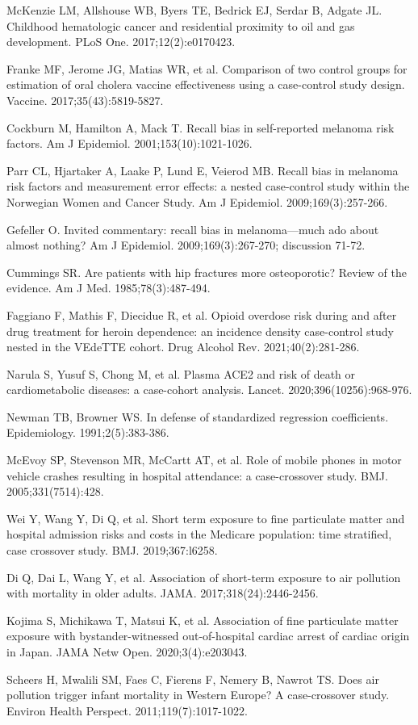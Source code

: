 \begin{references}
\item McKenzie LM, Allshouse WB, Byers TE, Bedrick EJ, Serdar B, Adgate JL. Childhood hematologic cancer and residential proximity to oil and gas development. PLoS One. 2017;12(2):e0170423.
\item Franke MF, Jerome JG, Matias WR, et al. Comparison of two control groups for estimation of oral cholera vaccine effectiveness using a case-control study design. Vaccine. 2017;35(43):5819-5827.
\item Cockburn M, Hamilton A, Mack T. Recall bias in self-reported melanoma risk factors. Am J Epidemiol. 2001;153(10):1021-1026.
\item Parr CL, Hjartaker A, Laake P, Lund E, Veierod MB. Recall bias in melanoma risk factors and measurement error effects: a nested case-control study within the Norwegian Women and Cancer Study. Am J Epidemiol. 2009;169(3):257-266.
\item Gefeller O. Invited commentary: recall bias in melanoma—much ado about almost nothing? Am J Epidemiol. 2009;169(3):267-270; discussion 71-72.
\item Cummings SR. Are patients with hip fractures more osteoporotic? Review of the evidence. Am J Med. 1985;78(3):487-494.
\item Faggiano F, Mathis F, Diecidue R, et al. Opioid overdose risk during and after drug treatment for heroin dependence: an incidence density case-control study nested in the VEdeTTE cohort. Drug Alcohol Rev. 2021;40(2):281-286.
\item Narula S, Yusuf S, Chong M, et al. Plasma ACE2 and risk of death or cardiometabolic diseases: a case-cohort analysis. Lancet. 2020;396(10256):968-976.
\item Newman TB, Browner WS. In defense of standardized regression coefficients. Epidemiology. 1991;2(5):383-386.
\item McEvoy SP, Stevenson MR, McCartt AT, et al. Role of mobile phones in motor vehicle crashes resulting in hospital attendance: a case-crossover study. BMJ. 2005;331(7514):428.
\item Wei Y, Wang Y, Di Q, et al. Short term exposure to fine particulate matter and hospital admission risks and costs in the Medicare population: time stratified, case crossover study. BMJ. 2019;367:l6258.
\item Di Q, Dai L, Wang Y, et al. Association of short-term exposure to air pollution with mortality in older adults. JAMA. 2017;318(24):2446-2456.
\item Kojima S, Michikawa T, Matsui K, et al. Association of fine particulate matter exposure with bystander-witnessed out-of-hospital cardiac arrest of cardiac origin in Japan. JAMA Netw Open. 2020;3(4):e203043.
\item Scheers H, Mwalili SM, Faes C, Fierens F, Nemery B, Nawrot TS. Does air pollution trigger infant mortality in Western Europe? A case-crossover study. Environ Health Perspect. 2011;119(7):1017-1022.
\end{references}
